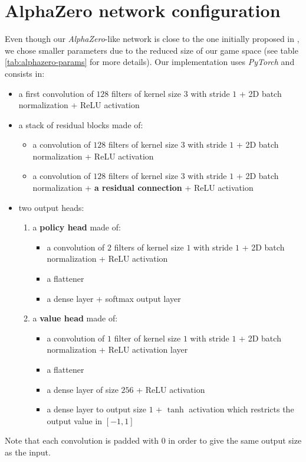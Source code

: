 \documentclass[journal, a4paper]{IEEEtran}
\begin{document}
\section*{AlphaZero network configuration}
\label{sec:alphazero-network}
Even though our \textit{AlphaZero}-like network is close to the one initially proposed in \cite{alphagozero}, we chose smaller parameters due to the reduced size of our game space (see table \ref{tab:alphazero-params} for more details). Our implementation uses \textit{PyTorch}\cite{pytorch} and consists in:
\begin{itemize}
    \item a first convolution of $128$ filters of kernel size $3$ with stride $1$ + 2D batch normalization + ReLU activation
    \item a stack of residual blocks made of:
    \begin{itemize}
        \item a convolution of $128$ filters of kernel size $3$ with stride $1$ + 2D batch normalization + ReLU activation
        \item a convolution of $128$ filters of kernel size $3$ with stride $1$ + 2D batch normalization + \textbf{a residual connection} + ReLU activation
    \end{itemize}
    \item two output heads:
    \begin{enumerate}
        \item a \textbf{policy head} made of:
            \begin{itemize}
                \item a convolution of $2$ filters of kernel size $1$ with stride $1$ + 2D batch normalization + ReLU activation
                \item a flattener
                \item a dense layer + softmax output layer
            \end{itemize}
        \item a \textbf{value head} made of:
            \begin{itemize}
                \item a convolution of $1$ filter of kernel size $1$ with stride $1$ + 2D batch normalization + ReLU activation layer
                \item a flattener
                \item a dense layer of size $256$ + ReLU activation
                \item a dense layer to output size $1$ + $\tanh$ activation which restricts the output value in $[-1,1]$
            \end{itemize}
    \end{enumerate}
\end{itemize}
Note that each convolution is padded with 0 in order to give the same output size as the input.



\end{document}

